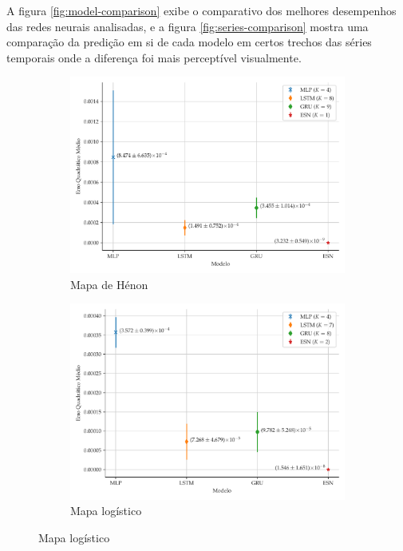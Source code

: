 \documentclass[a4paper, 12pt]{article}
\begin{document}
A figura \ref{fig:model-comparison} exibe o comparativo dos melhores desempenhos das redes neurais analisadas, e a figura \ref{fig:series-comparison} mostra uma comparação da predição em si de cada modelo em certos trechos das séries temporais onde a diferença foi mais perceptível visualmente.
\begin{figure}[H]
     \begin{subfigure}[t]{0.4\textwidth}
         \includegraphics[scale=0.35]{comparacao-k-henon.pdf}
         \caption{Mapa de Hénon}
     \end{subfigure}
     \centering
     \begin{subfigure}[t]{0.4\textwidth} 
         \includegraphics[scale=0.35]{comparacao-k-logistic.pdf}
         \caption{Mapa logístico}
     \end{subfigure}

\end{figure}
\end{document}

